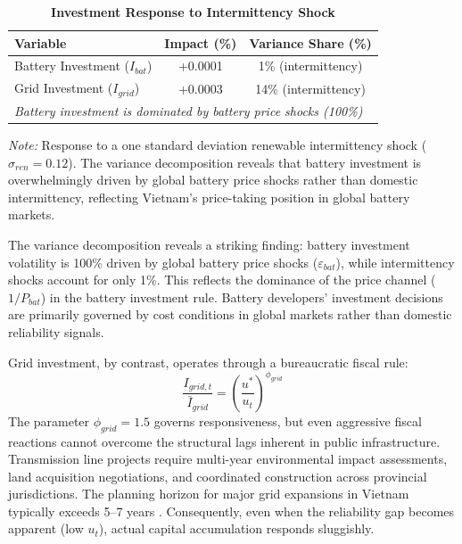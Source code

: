 \documentclass[12pt, a4paper]{article}
\begin{document}
\begin{table}[H]
    \centering
    \caption{\textbf{Investment Response to Intermittency Shock}}
    \label{tab:agility_differential}
    \renewcommand{\arraystretch}{1.3}
    \begin{tabular}{l c c}
        \toprule
        \textbf{Variable} & \textbf{Impact (\%)} & \textbf{Variance Share (\%)} \\
        \midrule
        Battery Investment ($I_{bat}$) & +0.0001 & 1\% (intermittency) \\
        Grid Investment ($I_{grid}$) & +0.0003 & 14\% (intermittency) \\
        \midrule
        \multicolumn{3}{l}{\textit{Battery investment is dominated by battery price shocks (100\%)}} \\
        \bottomrule
    \end{tabular}
    \vspace{0.2cm}
    \parbox{\textwidth}{\footnotesize \textit{Note:} Response to a one standard deviation renewable intermittency shock ($\sigma_{ren} = 0.12$). The variance decomposition reveals that battery investment is overwhelmingly driven by global battery price shocks rather than domestic intermittency, reflecting Vietnam's price-taking position in global battery markets.}
\end{table}

The variance decomposition reveals a striking finding: battery investment volatility is 100\% driven by global battery price shocks ($\varepsilon_{bat}$), while intermittency shocks account for only 1\%. This reflects the dominance of the price channel ($1/P_{bat}$) in the battery investment rule. Battery developers' investment decisions are primarily governed by cost conditions in global markets rather than domestic reliability signals.

Grid investment, by contrast, operates through a bureaucratic fiscal rule:
\begin{equation}
\frac{I_{grid,t}}{\bar{I}_{grid}} = \left(\frac{u^*}{u_t}\right)^{\phi_{grid}}
\end{equation}
The parameter $\phi_{grid} = 1.5$ governs responsiveness, but even aggressive fiscal reactions cannot overcome the structural lags inherent in public infrastructure. Transmission line projects require multi-year environmental impact assessments, land acquisition negotiations, and coordinated construction across provincial jurisdictions. The planning horizon for major grid expansions in Vietnam typically exceeds 5--7 years \citep{iea2023}. Consequently, even when the reliability gap becomes apparent (low $u_t$), actual capital accumulation responds sluggishly.
\end{document}
